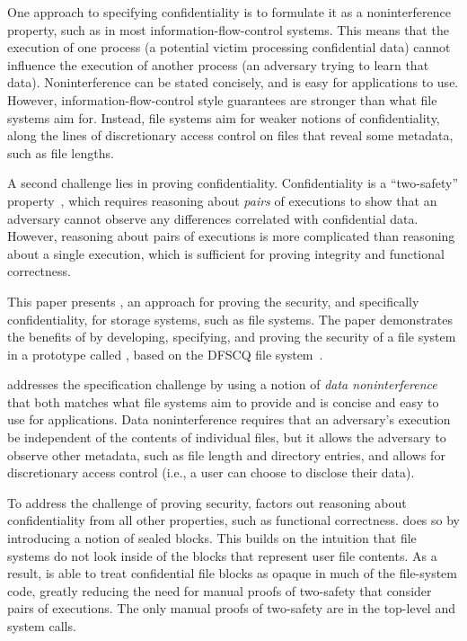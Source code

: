 One approach to specifying confidentiality is to formulate it as a
noninterference property, such as in most information-flow-control
systems.  This means that the execution of one process (a potential victim
processing confidential data) cannot influence the execution of another
process (an adversary trying to learn that data).  Noninterference can
be stated concisely, and is easy for applications to use.  However,
information-flow-control style guarantees are stronger than what file
systems aim for.  Instead, file systems aim for weaker notions of
confidentiality, along the lines of discretionary access control on
files that reveal some metadata, such as file lengths.

A second challenge lies in proving confidentiality.  Confidentiality is a
``two-safety'' property~\cite{terauchi:safety}, which requires reasoning
about \emph{pairs} of executions to show that an adversary cannot observe
any differences correlated with confidential data.  However, reasoning
about pairs of executions is more complicated than reasoning about a
single execution, which is sufficient for proving integrity and functional correctness.


This paper presents \sys, an approach for proving the security, and
specifically confidentiality, for storage systems, such as file systems.
The paper demonstrates the benefits of \sys by developing, specifying,
and proving the security of a file system in a prototype called \sfscq,
based on the DFSCQ file system~\cite{chen:dfscq}.

\sys addresses the specification challenge by using a notion of \emph{data
noninterference} that both matches what file systems aim to provide
and is concise and easy to use for applications.  Data noninterference
requires that an adversary's execution be independent of the contents of
individual files, but it allows the adversary to observe other metadata,
such as file length and directory entries, and allows for discretionary
access control (i.e., a user can choose to disclose their data).

To address the challenge of proving security, \sys factors out reasoning
about confidentiality from all other properties, such as functional
correctness.  \sys does so by introducing a notion of sealed blocks.
This builds on the intuition that file systems do not look inside of the
blocks that represent user file contents.  As a result, \sys is able to
treat confidential file blocks as opaque in much of the file-system code,
greatly reducing the need for manual proofs of two-safety that consider
pairs of executions.  The only manual proofs of two-safety are in the
top-level  and  system calls.

